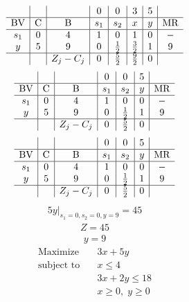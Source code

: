 \documentclass{article}
\begin{document}
\begin{align*}
\begin{array}{c|c|c|c|c|c|c|c}
 &  &  & 0 & 0 & 3 & 5 & \\
\hline
\text{BV} & \text{C} & \text{B} & s_{1} & s_{2} & x & y & \text{MR} \\
\hline
s_{1} & 0 & 4 & 1 & 0 & 1 & 0 & - \\
y & 5 & 9 & 0 & \frac{1}{2} & \frac{3}{2} & 1 & 9 \\
\hline
 &  & Z_j-C_j & 0 & \frac{5}{2} & \frac{9}{2} & 0 & \\
\end{array}
\end{align*}
\begin{align*}
\begin{array}{c|c|c|c|c|c|c}
 &  &  & 0 & 0 & 5 & \\
\hline
\text{BV} & \text{C} & \text{B} & s_{1} & s_{2} & y & \text{MR} \\
\hline
s_{1} & 0 & 4 & 1 & 0 & 0 & - \\
y & 5 & 9 & 0 & \frac{1}{2} & 1 & 9 \\
\hline
 &  & Z_j-C_j & 0 & \frac{5}{2} & 0 & \\
\end{array}
\end{align*}
\begin{align*}
\begin{array}{c|c|c|c|c|c|c}
 &  &  & 0 & 0 & 5 & \\
\hline
\text{BV} & \text{C} & \text{B} & s_{1} & s_{2} & y & \text{MR} \\
\hline
s_{1} & 0 & 4 & 1 & 0 & 0 & - \\
y & 5 & 9 & 0 & \frac{1}{2} & 1 & 9 \\
\hline
 &  & Z_j-C_j & 0 & \frac{5}{2} & 0 & \\
\end{array}
\end{align*}
\begin{align*}
\left.5y\right|_{s_{1}=0,s_{2}=0,y=9}=45\end{align*}
\begin{align*}
Z=45\end{align*}
\begin{align*}
y=9\end{align*}
\begin{align*}
\text{Maximize} \quad & 3x + 5y\\
\text{subject to} \quad
& x\le4\\
& 3x + 2y\le18\\
& x\ge0,\; y\ge0\end{align*}
\end{document}
